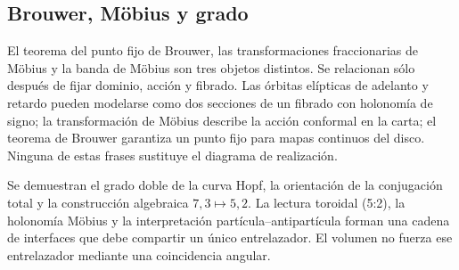 \subsection{Brouwer, Möbius y grado}

El teorema del punto fijo de Brouwer, las transformaciones fraccionarias de
Möbius y la banda de Möbius son tres objetos distintos. Se relacionan sólo
después de fijar dominio, acción y fibrado. Las órbitas elípticas de adelanto y
retardo pueden modelarse como dos secciones de un fibrado con holonomía de
signo; la transformación de Möbius describe la acción conformal en la carta;
el teorema de Brouwer garantiza un punto fijo para mapas continuos del disco.
Ninguna de estas frases sustituye el diagrama de realización.

\begin{remark}
Se demuestran el grado doble de la curva Hopf, la orientación de la
conjugación total y la construcción algebraica \(7,3\mapsto5,2\). La lectura
toroidal (5{:}2), la holonomía Möbius y la interpretación
partícula--antipartícula forman una cadena de interfaces que debe compartir un
único entrelazador. El volumen no fuerza ese entrelazador mediante una
coincidencia angular.
\end{remark}
